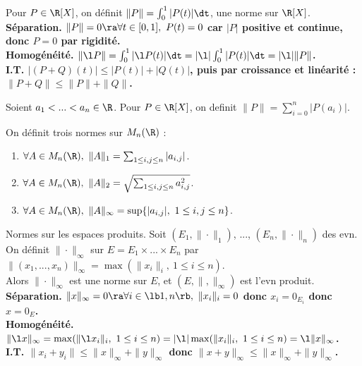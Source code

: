 \documentclass[11pt]{article}
\begin{document}
\vspace*{-0.8cm}

\begin{ex}{}{}
    Pour $P\in\R[X]$, on définit $\|P\|=\int_0^1|P(t)|\dt$, une norme sur $\R[X]$.
    \tcblower
    \bf{Séparation.} $\|P\|=0 \ra \forall t \in [0,1], ~ P(t)=0$ car $|P|$ positive et continue, donc $P=0$ par rigidité.\\
    \bf{Homogénéité.} $\|\l P\|=\int_0^1|\l P(t)|\dt = |\l|\int_0^1|P(t)|\dt=|\l|\|P\|$.\\
    \bf{I.T.} $|(P+Q)(t)|\leq|P(t)|+|Q(t)|$, puis par croissance et linéarité : $\|P+Q\|\leq\|P\|+\|Q\|$.
\end{ex}

\vspace*{-0.8cm}

\begin{ex}{}{}
    Soient $a_1<...<a_n\in\R$. Pour $P\in\R[X]$, on definit $\|P\|=\sum_{i=0}^n|P(a_i)|$.
\end{ex}

\vspace*{-0.8cm}

\begin{ex}{}{}
    On définit trois normes sur $M_n(\R)$ :
    \begin{enumerate}
        \item $\forall A \in M_n(\R), ~ \|A\|_1=\sum_{1\leq i,j\leq n}|a_{i,j}|$.
        \item $\forall A \in M_n(\R), ~ \|A\|_2=\sqrt{\sum_{1\leq i,j \leq n} a_{i,j}^2}$.
        \item $\forall A \in M_n(\R), ~ \|A\|_{\infty}=\sup\{|a_{i,j}|, ~ 1 \leq i,j \leq n\}$.
    \end{enumerate}
\end{ex}

\vspace*{-0.8cm}

\begin{prop}{Normes sur les espaces produits.}{}
    Soit $(E_1,\|\cdot\|_1)$, ..., $(E_n,\|\cdot\|_n)$ des evn.\\
    On définit $\|\cdot\|_{\infty}$ sur $E=E_1\times...\times E_n$ par $\|(x_1,...,x_n)\|_{\infty}=\max(\|x_i\|_i, ~ 1\leq i \leq n)$.\\
    Alors $\|\cdot\|_{\infty}$ est une norme sur $E$, et $(E,\|,\|_{\infty})$ est l'evn produit.
    \tcblower
    \bf{Séparation.} $\|x\|_{\infty}=0\ra\forall i \in \lb1,n\rb, ~ \|x_i\|_i=0 $ donc $x_i=0_{E_i}$ donc $x=0_E$.\\
    \bf{Homogénéité.} $\|\l x\|_\infty = \max(\|\l x_i\|_i, ~ 1 \leq i \leq n) = |\l|\max(\|x_i\|_i, ~ 1 \leq i \leq n)=\l\|x\|_{\infty}$.\\
    \bf{I.T.} $\|x_i+y_i\|\leq \|x\|_{\infty} + \|y\|_\infty$ donc $\|x+y\|_\infty\leq\|x\|_{\infty}+\|y\|_{\infty}$.
\end{prop}
\end{document}
